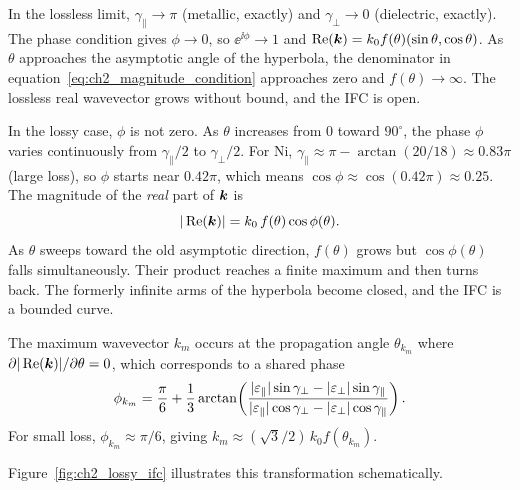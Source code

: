 In the lossless limit, $\gamma_\parallel \to \pi$ (metallic, exactly) and
$\gamma_\perp \to 0$ (dielectric, exactly). The phase condition gives
$\phi \to 0$, so $\ee^{\ii\phi} \to 1$ and $\operatorname{Re}(\bm{k}) = k_0 f(\theta)(\sin\theta,
\cos\theta)$. As $\theta$ approaches the asymptotic angle of the hyperbola,
the denominator in equation~\eqref{eq:ch2_magnitude_condition} approaches
zero and $f(\theta) \to \infty$. The lossless real wavevector grows without
bound, and the IFC is open.

In the lossy case, $\phi$ is not zero. As $\theta$ increases from $0$ toward
$90^\circ$, the phase $\phi$ varies continuously from $\gamma_\parallel/2$
to $\gamma_\perp/2$. For Ni, $\gamma_\parallel \approx \pi - \arctan(20/18)
\approx 0.83\pi$ (large loss), so $\phi$ starts near $0.42\pi$, which means
$\cos\phi \approx \cos(0.42\pi) \approx 0.25$. The magnitude of the
\emph{real} part of $\bm{k}$ is
\begin{equation}
  |\operatorname{Re}(\bm{k})| = k_0\,f(\theta)\cos\phi(\theta).
  \label{eq:ch2_Rk_product}
\end{equation}
As $\theta$ sweeps toward the old asymptotic direction, $f(\theta)$ grows
but $\cos\phi(\theta)$ falls simultaneously. Their product reaches a finite
maximum and then turns back. The formerly infinite arms of the hyperbola
become closed, and the IFC is a bounded curve.

The maximum wavevector $k_m$ occurs at the propagation angle $\theta_{k_m}$
where $\partial|\operatorname{Re}(\bm{k})|/\partial\theta = 0$, which corresponds to a
shared phase
\begin{equation}
  \phi_{k_m} = \frac{\pi}{6} + \frac{1}{3}\arctan\!\left(
    \frac{|\varepsilon_{\parallel}|\sin\gamma_\perp - |\varepsilon_{\perp}|\sin\gamma_\parallel}
         {|\varepsilon_{\parallel}|\cos\gamma_\perp - |\varepsilon_{\perp}|\cos\gamma_\parallel}\right).
  \label{eq:ch2_phikm}
\end{equation}
For small loss, $\phi_{k_m} \approx \pi/6$, giving $k_m \approx
(\sqrt{3}/2)\,k_0 f(\theta_{k_m})$.

Figure~\ref{fig:ch2_lossy_ifc} illustrates this transformation schematically.

